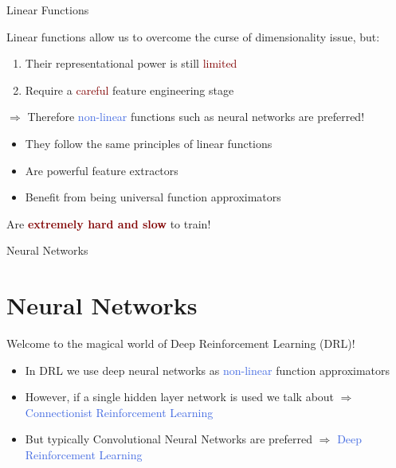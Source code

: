 \documentclass{beamer}
\begin{document}
\begin{frame}{Linear Functions}

	Linear functions allow us to overcome the curse of dimensionality issue, but:
	\begin{enumerate}
		\item Their representational power is still \textcolor{Maroon}{limited}
		\item Require a \textcolor{Maroon}{careful} feature engineering stage
	\end{enumerate}

	\bigskip

	$\Rightarrow$ Therefore \textcolor{RoyalBlue}{non-linear} functions such as neural networks are preferred!
	\begin{itemize}
		\item They follow the same principles of linear functions 
		\item Are powerful feature extractors 
		\item Benefit from being universal function approximators
	\end{itemize}

	\bigskip

	\begin{center}
		Are \textcolor{Maroon}{\textbf{extremely hard and slow}} to train!
	\end{center}

\end{frame}


\begin{frame}{Neural Networks}
	\section{Neural Networks}

	\begin{center}
		\textcolor{skymagenta}{Welcome to the magical world of Deep Reinforcement Learning (DRL)!}
	\end{center}

	\begin{itemize}
		\item In DRL we use deep neural networks as \textcolor{RoyalBlue}{non-linear} function approximators
		\item However, if a single hidden layer network is used we talk about $\Rightarrow$ \textcolor{RoyalBlue}{Connectionist Reinforcement Learning}	
		\item But typically Convolutional Neural Networks are preferred $\Rightarrow$ \textcolor{RoyalBlue}{Deep Reinforcement Learning}
	\end{itemize}
	
\end{frame}
\end{document}
